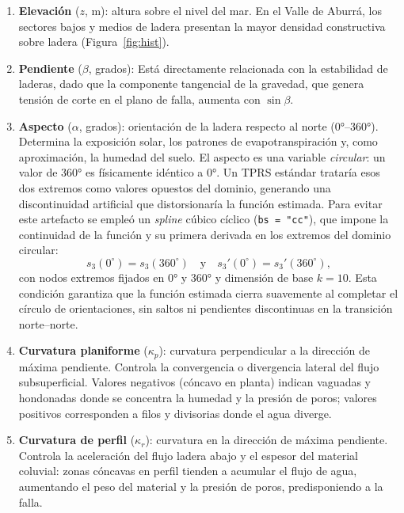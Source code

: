 \documentclass[12pt,a4paper]{article}
\begin{document}
\begin{enumerate}

\item \textbf{Elevación} ($z$, m): altura sobre el nivel del mar.
En el Valle de
Aburrá, los sectores bajos y medios de ladera presentan
la mayor densidad
constructiva sobre ladera (Figura~\ref{fig:hist}).

\item \textbf{Pendiente} ($\beta$, grados): Está directamente relacionada con la estabilidad de laderas, dado que
la componente tangencial de la gravedad, que genera tensión de corte
en el plano de falla, aumenta con $\sin\beta$.

\item \textbf{Aspecto} ($\alpha$, grados): orientación de la ladera
respecto al norte (0°--360°). Determina la exposición solar, los
patrones de evapotranspiración y, como aproximación, la humedad del
suelo. El aspecto es una variable \textit{circular}: un valor de 360°
es físicamente idéntico a 0°. Un TPRS estándar trataría esos dos
extremos como valores opuestos del dominio, generando una
discontinuidad artificial que distorsionaría la función estimada.
Para evitar este artefacto se empleó un \textit{spline} cúbico
cíclico (\texttt{bs\,=\,"cc"}), que impone la continuidad de la
función y su primera derivada en los extremos del dominio circular:
\begin{equation}
    s_3(0^{\circ}) = s_3(360^{\circ}) \quad\text{y}\quad
    s_3'(0^{\circ}) = s_3'(360^{\circ}),
    \label{eq:cyclic}
\end{equation}
con nodos extremos fijados en 0° y 360° y dimensión de base $k=10$.
Esta condición garantiza que la función estimada cierra suavemente
al completar el círculo de orientaciones, sin saltos ni pendientes
discontinuas en la transición norte--norte.

\item \textbf{Curvatura planiforme} ($\kappa_p$): curvatura
perpendicular a la dirección de máxima pendiente. Controla la
convergencia o divergencia lateral del flujo subsuperficial. Valores
negativos (cóncavo en planta) indican vaguadas y hondonadas donde
se concentra la humedad y la presión de poros; valores positivos
corresponden a filos y divisorias donde el agua diverge.

\item \textbf{Curvatura de perfil} ($\kappa_r$): curvatura en la
dirección de máxima pendiente. Controla la aceleración del flujo
ladera abajo y el espesor del material coluvial: zonas cóncavas en
perfil tienden a acumular el flujo de agua, aumentando el peso del
material y la presión de poros, predisponiendo a la falla.


\end{enumerate}
\end{document}
